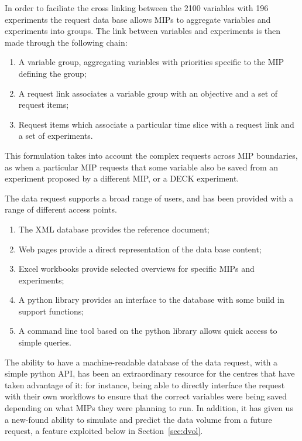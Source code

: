 \documentclass[gmd,manuscript]{copernicus}
\newcommand{\secref}[1] {\mbox{Section  \ref{sec:#1}}}
\begin{document}
In order to faciliate the cross linking between the 2100 variables
with 196 experiments the request data base allows MIPs to aggregate
variables and experiments into groups. The link between variables and
experiments is then made through the following chain:

\begin{enumerate}
\item A variable group, aggregating variables with priorities specific
  to the MIP defining the group;
\item A request link associates a variable group with an objective and
  a set of request items;
\item Request items which associate a particular time slice with a
  request link and a set of experiments.
\end{enumerate}

This formulation takes into account the complex requests across MIP
boundaries, as when a particular MIP requests that some variable also
be saved from an experiment proposed by a different MIP, or a DECK
experiment.

The data request supports a broad range of users, and has been
provided with a range of different access points.

\begin{enumerate}
\item The XML database provides the reference document;
\item Web pages provide a direct representation of the data base
  content;
\item Excel workbooks provide selected overviews for specific MIPs and
  experiments;
\item A python library provides an interface to the database with some
  build in support functions;
\item A command line tool based on the python library allows quick
  access to simple queries.
\end{enumerate}


The ability to have a machine-readable database of the data request,
with a simple python API, has been an extraordinary resource for the
centres that have taken advantage of it: for instance, being able to
directly interface the request with their own workflows to ensure that
the correct variables were being saved depending on what MIPs they
were planning to run. In addition, it has given us a new-found ability
to simulate and predict the data volume from a future request, a
feature exploited below in \secref{dvol}.
\end{document}
